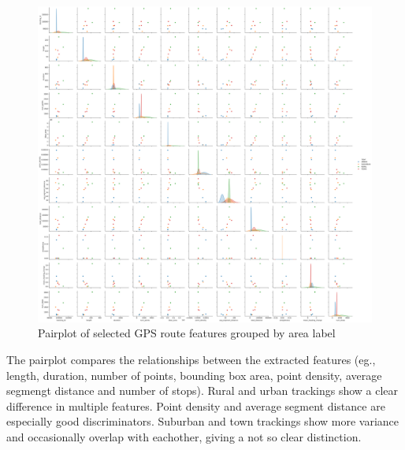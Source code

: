 \documentclass[a4paper,12pt,twoside]{scrreprt}
\begin{document}
\begin{figure}[htbp]
  \centering
  \includegraphics[width=\textwidth]{Figures/sample_pairplot.png}
  \caption{Pairplot of selected GPS route features grouped by area label}
  \label{fig:sample_pairplot}
\end{figure}
\FloatBarrier

The pairplot compares the relationships between the extracted features (eg.,
length, duration, number of points, bounding box area, point density, average
segmengt distance and number of stops). Rural and urban trackings show a clear
difference in multiple features. Point density and average segment distance are
especially good discriminators. Suburban and town trackings show more variance
and occasionally overlap with eachother, giving a not so clear distinction.
\end{document}
